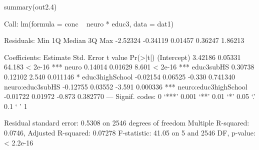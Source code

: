 \begin{Schunk}
\begin{Sinput}
 summary(out2.4)
\end{Sinput}
\begin{Soutput}
Call:
lm(formula = conc ~ neuro * educ3, data = dat1)

Residuals:
     Min       1Q   Median       3Q      Max 
-2.52324 -0.34119  0.01457  0.36247  1.86213 

Coefficients:
                      Estimate Std. Error t value Pr(>|t|)    
(Intercept)            3.42186    0.05331  64.183  < 2e-16 ***
neuro                  0.14014    0.01629   8.601  < 2e-16 ***
educ3subHS             0.30738    0.12102   2.540 0.011146 *  
educ3highSchool       -0.02154    0.06525  -0.330 0.741340    
neuro:educ3subHS      -0.12755    0.03552  -3.591 0.000336 ***
neuro:educ3highSchool -0.01722    0.01972  -0.873 0.382770    
---
Signif. codes:  0 ‘***’ 0.001 ‘**’ 0.01 ‘*’ 0.05 ‘.’ 0.1 ‘ ’ 1

Residual standard error: 0.5308 on 2546 degrees of freedom
Multiple R-squared:  0.0746,	Adjusted R-squared:  0.07278 
F-statistic: 41.05 on 5 and 2546 DF,  p-value: < 2.2e-16
\end{Soutput}
\end{Schunk}
